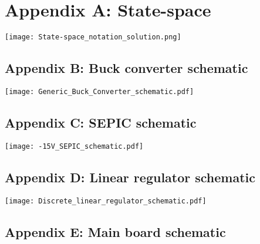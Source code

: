\chapter*{Appendix A: State-space}
\label{chap:appendix-A-statespace}


    \texttt{[image: State-space\_notation\_solution.png]}
\newpage
\newpage

\section*{Appendix B: Buck converter schematic}
\texttt{[image: Generic\_Buck\_Converter\_schematic.pdf]}

\section*{Appendix C: SEPIC schematic}
\texttt{[image: -15V\_SEPIC\_schematic.pdf]}

\section*{Appendix D: Linear regulator schematic}
\texttt{[image: Discrete\_linear\_regulator\_schematic.pdf]}

\section*{Appendix E: Main board schematic}
